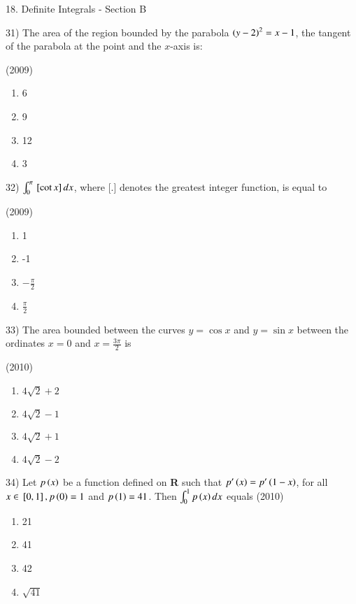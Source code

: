 \documentclass[journal,12pt,twocolumn]{IEEEtran}
\theoremstyle{remark}
\begin{document}
18. Definite Integrals - Section B

31)
	 The area of the region bounded by the parabola $\left(y-2\right)^2=x-1$, the tangent of the parabola at the point  and the $x$-axis is:

		\hfill{(2009)}

		\begin{multicols}{4}
			\begin{enumerate}[label=(\alph*)]
				\item 6
				\item 9
				\item 12
				\item 3
			\end{enumerate}
		\end{multicols}

32)
	 $\int_0^\pi{}\left[\cot x\right]dx$, where [.] denotes the greatest integer function, is equal to

		\hfill{(2009)}

		\begin{multicols}{4}
			\begin{enumerate}[label=(\alph*)]
				\item 1
				\item -1
				\item $-\frac{\pi}{2}$
				\item $\frac{\pi}{2}$
			\end{enumerate}
		\end{multicols}

33)
	 The area bounded between the curves $y=\cos x$ and $y=\sin x$ between the ordinates $x=0$ and $x=\frac{3\pi}{2}$ is

		\hfill{(2010)}

		\begin{multicols}{2}
			\begin{enumerate}[label=(\alph*)]
				\item $4\sqrt{2}+2$
				\item $4\sqrt{2}-1$
				\item $4\sqrt{2}+1$
				\item $4\sqrt{2}-2$
			\end{enumerate}
		\end{multicols}

34)
	 Let $p\left(x\right)$ be a function defined on \textbf{R} such that $p'\left(x\right)=p'\left(1-x\right)$, for all $x\in{}\left[0,1\right],p\left(0\right)=1$ and $p\left(1\right)=41$. Then $\int_0^1p\left(x\right)dx$ equals
		\hfill{(2010)}

		\begin{multicols}{4}
			\begin{enumerate}[label=(\alph*)]
				\item 21
				\item 41
				\item 42
				\item $\sqrt{41}$
			\end{enumerate}
		\end{multicols}
\end{document}
